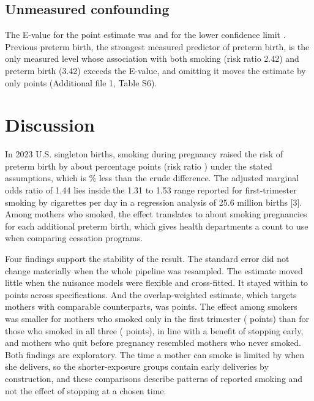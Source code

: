 \documentclass[11pt,letterpaper]{article}
\begin{document}
\begin{table}[htbp]
\centering
\caption{Trimester of smoking and third-trimester intensity, each group against mothers who never smoked (full 2023 natality file; risk difference in percentage points).}\label{tab:tri}
\resizebox{\textwidth}{!}{}
\end{table}

\subsection*{Unmeasured confounding}
The E-value for the point estimate was \EV{} and for the lower confidence limit \EVlo{}. Previous preterm birth, the strongest measured predictor of preterm birth, is the only measured level whose association with both smoking (risk ratio 2.42) and preterm birth (3.42) exceeds the E-value, and omitting it moves the estimate by only \PPChange{} points (Additional file 1, Table S6).

\section*{Discussion}

In 2023 U.S. singleton births, smoking during pregnancy raised the risk of preterm birth by about \RDmain{} percentage points (risk ratio \RRmain{}) under the stated assumptions, which is \ReducePct{}\% less than the crude difference. The adjusted marginal odds ratio of 1.44 lies inside the 1.31 to 1.53 range reported for first-trimester smoking by cigarettes per day in a regression analysis of 25.6 million births [3]. Among mothers who smoked, the effect translates to about \OneIn{} smoking pregnancies for each additional preterm birth, which gives health departments a count to use when comparing cessation programs.

Four findings support the stability of the result. The standard error did not change materially when the whole pipeline was resampled. The estimate moved little when the nuisance models were flexible and cross-fitted. It stayed within \RangeMin{} to \RangeMax{} points across specifications. And the overlap-weighted estimate, which targets mothers with comparable counterparts, was \ATO{} points. The effect among smokers was smaller for mothers who smoked only in the first trimester (\TriAATT{} points) than for those who smoked in all three (\TriCATT{} points), in line with a benefit of stopping early, and mothers who quit before pregnancy resembled mothers who never smoked. Both findings are exploratory. The time a mother can smoke is limited by when she delivers, so the shorter-exposure groups contain early deliveries by construction, and these comparisons describe patterns of reported smoking and not the effect of stopping at a chosen time.
\end{document}
